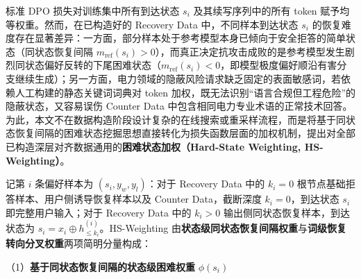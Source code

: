 \documentclass[fontset=fandol,type=master,campus=shenzhen,etitleauto=true]{hithesisbook}
\begin{document}
标准 DPO 损失对训练集中所有到达状态 \(s_i\) 及其续写序列中的所有 token 赋予均等权重。然而，在已构造好的 Recovery Data 中，不同样本到达状态 \(s_i\) 的恢复难度存在显著差异：一方面，部分样本处于参考模型本身已倾向于安全拒答的简单状态（同状态恢复间隔 \(m_{\text{ref}}(s_i) > 0\)），而真正决定抗攻击成败的是参考模型发生剧烈同状态偏好反转的下尾困难状态（\(m_{\text{ref}}(s_i) < 0\)，即模型极度偏好顺沿有害分支继续生成）；另一方面，电力领域的隐蔽风险请求缺乏固定的表面敏感词，若依赖人工构建的静态关键词词典对 token 加权，既无法识别“语言合规但工程危险”的隐蔽状态，又容易误伤 Counter Data 中包含相同电力专业术语的正常技术回答。为此，本文不在数据构造阶段设计复杂的在线搜索或重采样流程，而是将基于同状态恢复间隔的困难状态挖掘思想直接转化为损失函数层面的加权机制，提出对全部已构造深层对齐数据通用的\textbf{困难状态加权（Hard-State Weighting, HS-Weighting）}。

记第 $i$ 条偏好样本为 \((s_i, y_w, y_l)\)：对于 Recovery Data 中的 \(k_i=0\) 根节点基础拒答样本、用户侧诱导恢复样本以及 Counter Data，截断深度 \(k_i=0\)，到达状态 \(s_i\) 即完整用户输入；对于 Recovery Data 中的 \(k_i>0\) 输出侧同状态恢复样本，到达状态为 \(s_i = x_i \oplus h_{\leq k_i}^{(i)}\)。HS-Weighting 由\textbf{状态级同状态恢复间隔权重}与\textbf{词级恢复转向分叉权重}两项简明分量构成：

\noindent （1）\textbf{基于同状态恢复间隔的状态级困难权重} $\phi(s_i)$
\end{document}
